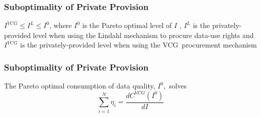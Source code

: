 \begin{frame}[allowframebreaks]%
\frametitle{Suboptimality of Private Provision}
\begin{theorem}
\label{theorem:suboptimality}$%
I^{VCG}\leq I^{L}\leq I^{0}$, where $I^{0}$ is the Pareto optimal level of $%
I $ , $I^{L}$
is the privately-provided level when using the Lindahl mechanism to procure
data-use rights and $I^{VCG}$ is the privately-provided level when using the
VCG\ procurement mechanism

\end{theorem}


\end{frame}%
%



\begin{frame}[allowframebreaks]%
\frametitle{Suboptimality of Private Provision}
The Pareto optimal consumption of data quality, $I^{0},$ solves
\begin{equation}
\sum_{i=1}^{N}\eta _{i}=\frac{dC^{VCG}\left( I^{0}\right) }{dI}
\label{eqn:pareto_optimality}
\end{equation}%

\end{frame}%
%



